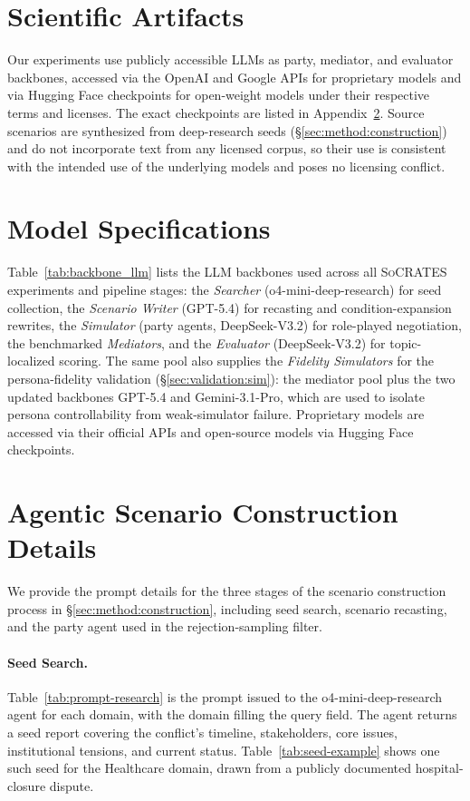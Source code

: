 \documentclass{llmxive}
\providecommand{\algname}{\textsc{SoCRATES}}
\begin{document}
\section{Scientific Artifacts}
Our experiments use publicly accessible LLMs as party, mediator, and evaluator backbones, accessed via the OpenAI and Google APIs for proprietary models and via Hugging Face checkpoints for open-weight models under their respective terms and licenses. The exact checkpoints are listed in Appendix~\ref{app:models}.
%
Source scenarios are synthesized from deep-research seeds (\S\ref{sec:method:construction}) and do not incorporate text from any licensed corpus, so their use is consistent with the intended use of the underlying models and poses no licensing conflict. 

\section{Model Specifications}
\label{app:models}

Table~\ref{tab:backbone_llm} lists the LLM backbones used across all \algname{} experiments and pipeline stages: the \emph{Searcher} (o4-mini-deep-research) for seed collection, the \emph{Scenario Writer} (GPT-5.4) for recasting and condition-expansion rewrites, the \emph{Simulator} (party agents, DeepSeek-V3.2) for role-played negotiation, the benchmarked \emph{Mediators}, and the \emph{Evaluator} (DeepSeek-V3.2) for topic-localized scoring. The same pool also supplies the \emph{Fidelity Simulators} for the persona-fidelity validation (\S\ref{sec:validation:sim}): the mediator pool plus the two updated backbones GPT-5.4 and Gemini-3.1-Pro, which are used to isolate persona controllability from weak-simulator failure. Proprietary models are accessed via their official APIs and open-source models via Hugging Face checkpoints.


\section{Agentic Scenario Construction Details}
\label{app:scenario_detail}

We provide the prompt details for the three stages of the scenario construction process in \S\ref{sec:method:construction}, including seed search, scenario recasting, and the party agent used in the rejection-sampling filter.

\paragraph{Seed Search.}
Table~\ref{tab:prompt-research} is the prompt issued to the o4-mini-deep-research agent for each domain, with the domain filling the query field. The agent returns a seed report covering the conflict's timeline, stakeholders, core issues, institutional tensions, and current status. Table~\ref{tab:seed-example} shows one such seed for the Healthcare domain, drawn from a publicly documented hospital-closure dispute.
\end{document}
